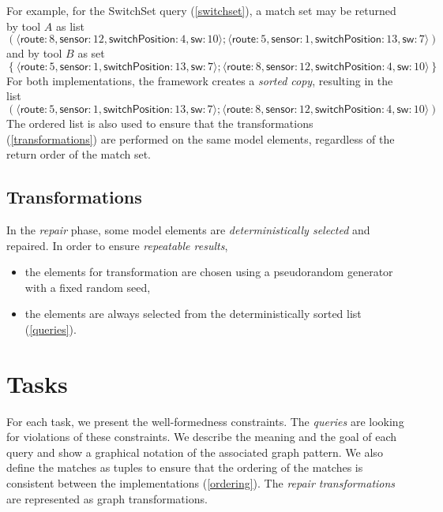\documentclass[submission,copyright,creativecommons]{eptcs}
\begin{document}
  
For example, for the \textsf{SwitchSet} query (\autoref{switchset}), a match set may be returned by tool $A$ as list
\[\left(
\langle\textsf{route}: 8, \textsf{sensor}: 12, \textsf{switchPosition}: 4, \textsf{sw}: 10\rangle;
\langle\textsf{route}: 5, \textsf{sensor}: 1, \textsf{switchPosition}: 13, \textsf{sw}: 7\rangle
\right)\]
and by tool $B$ as set
\[\left\{
\langle\textsf{route}: 5, \textsf{sensor}: 1, \textsf{switchPosition}: 13, \textsf{sw}: 7\rangle;
\langle\textsf{route}: 8, \textsf{sensor}: 12, \textsf{switchPosition}: 4, \textsf{sw}: 10\rangle
\right\}\]
For both implementations, the framework creates a \emph{sorted copy}, resulting in the list
\[\left(
\langle\textsf{route}: 5, \textsf{sensor}: 1, \textsf{switchPosition}: 13, \textsf{sw}: 7\rangle;
\langle\textsf{route}: 8, \textsf{sensor}: 12, \textsf{switchPosition}: 4, \textsf{sw}: 10\rangle
\right)\]
The ordered list is also used to ensure that the transformations (\autoref{transformations}) are performed on the same model elements, regardless of the return order of the match set.

\subsection{Transformations}
\label{transformations}

In the \emph{repair} phase, some model elements are \emph{deterministically selected} and repaired. In order to ensure \emph{repeatable results},

\begin{itemize}
  \item the elements for transformation are chosen using a pseudorandom generator with a fixed random seed,
  \item the elements are always selected from the deterministically sorted list (\autoref{queries}).
\end{itemize}

\section{Tasks}
\label{tasks}

For each task, we present the well-formedness constraints. The \emph{queries} are looking for violations of these constraints. We describe the meaning and the goal of each query and show a graphical notation of the associated graph pattern. We also define the matches as tuples to ensure that the ordering of the matches is consistent between the implementations (\autoref{ordering}). The \emph{repair transformations} are represented as graph transformations.
\end{document}
